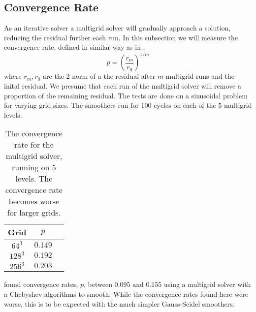 \subsection{Convergence Rate}
	As an iterative solver a multigrid solver will gradually approach a solution,
	reducing the residual further each run. In this subsection we will measure the convergence
	rate, defined in similar way as in \citet{zhukov_parallel_2014},
	\begin{equation}
		p = \left(\frac{r_m}{r_0}\right)^{1/m}
	\end{equation}
	where \(r_m, r_0\) are the \(2\)-norm of a the residual after \(m\) multigrid runs
 	and the inital residual. We presume that each run of the multigrid solver will
	remove a proportion of the remaining residual.
	The tests are done on a sinusoidal
	problem for varying grid sizes. The smoothers run for \(100\) cycles on each of the \(5\) multigrid levels.
	\begin{table}
	\centering
		\begin{tabular}{c|c|c}
			Grid 		& \(p\)
			\\ \hline
			\(64^3\)	& \(0.149\)
			\\ \hline
			\(128^3\)	& \(0.192\)
			\\ \hline
			\(256^3\)	& \(0.203\)
		\end{tabular}
		\caption{The convergence rate for the multigrid solver, running on \(5\) levels. The convergence rate becomes
		worse for larger grids.}
	\end{table}
	\citeauthor{zhukov_parallel_2014} found convergence rates, \(p\), between  \( 0.095 \text{ and } 0.155\)
	using a multigrid solver with a Chebyshev algorithms to smooth. While the convergence rates found here were
	worse, this is to be expected with the much simpler Gauss-Seidel smoothers.
